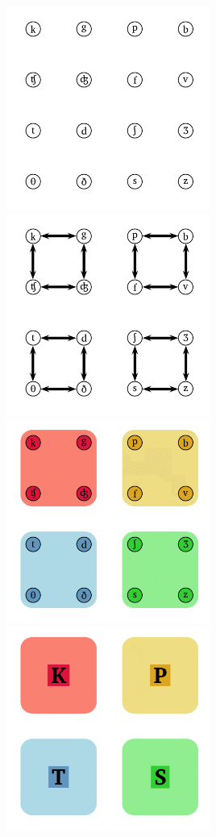 \includegraphics[width=0.5\textwidth]{img/classes-0.png}
\includegraphics[width=0.5\textwidth]{img/classes-1.png}
\includegraphics[width=0.5\textwidth]{img/classes-2.png}
\includegraphics[width=0.5\textwidth]{img/classes-3.png}




